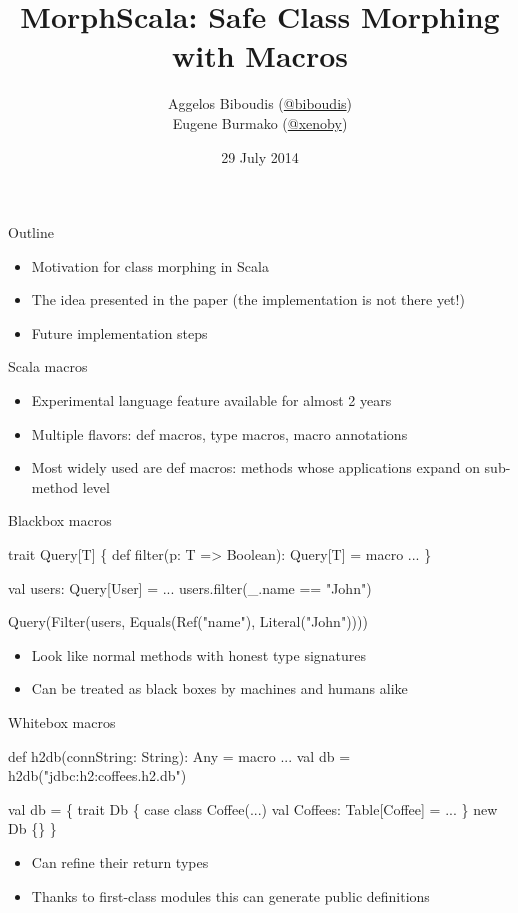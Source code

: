\documentclass[svgnames,dvipsnames,hyperref={bookmarks=false},usepdftitle=false]{beamer}
\title{MorphScala: Safe Class Morphing with Macros}
\author{Aggelos Biboudis (\href{https://twitter.com/biboudis}{@biboudis})\\ Eugene Burmako (\href{https://twitter.com/xeno_by}{@xeno{\textunderscore}by})}
\institute{University of Athens\\ \'Ecole Polytechnique F\'ed\'erale de Lausanne}
\date{29 July 2014}
\begin{document}
\titleframe

\begin{frame}{Outline}
\begin{itemize}
\item Motivation for class morphing in Scala
\item The idea presented in the paper (the implementation is not there yet!)
\item Future implementation steps
\end{itemize}
\end{frame}


\begin{frame}{Scala macros}
\begin{itemize}
\item Experimental language feature available for almost 2 years
\item Multiple flavors: def macros, type macros, macro annotations
\item Most widely used are def macros: methods whose applications expand on sub-method level
\end{itemize}
\end{frame}

\begin{frame}[fragile]{Blackbox macros}
\begin{semiverbatim}
trait Query[T] \{
  \alert{def filter(p: T => Boolean): Query[T] = macro ...}
\}

val users: Query[User] = ...
users\alert{.filter(}_.name == "John"\alert{)}


                          \arrowdown

Query(Filter(users, Equals(Ref("name"), Literal("John"))))

\end{semiverbatim}

\begin{itemize}
\item Look like normal methods with honest type signatures
\item Can be treated as black boxes by machines and humans alike
\end{itemize}
\end{frame}

\begin{frame}[fragile]{Whitebox macros}
\begin{semiverbatim}
\alert{def h2db(connString: String): Any = macro ...}
val db = \alert{h2db(}"jdbc:h2:coffees.h2.db"\alert{)}

                          \arrowdown

val db = \{
  trait Db \{
    case class Coffee(...)
    val Coffees: Table[Coffee] = ...
  \}
  new Db \{\}
\}

\end{semiverbatim}

\begin{itemize}
\item Can refine their return types
\item Thanks to first-class modules this can generate public definitions
\end{itemize}
\end{frame}
\end{document}
